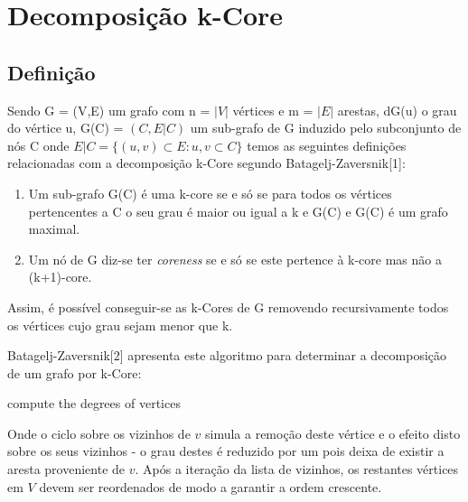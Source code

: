 \documentclass[a4paper,10pt]{report}
\begin{document}
\section*{Decomposição k-Core}


\subsection*{Definição}
Sendo G = (V,E) um grafo com n = $|V|$ vértices e m = $|E|$ arestas, dG(u) o grau do vértice u, G(C) = $(C, E|C)$ um sub-grafo de G induzido pelo subconjunto de nós C onde $E|C = \{(u,v)\subset E : u,v \subset C\} $ temos as seguintes definições relacionadas com a decomposição k-Core segundo Batagelj-Zaversnik[1]:

\begin{enumerate}
	\item Um sub-grafo G(C) é uma k-core se e só se para todos os vértices pertencentes a C o seu grau é maior ou igual a k e G(C) e G(C) é um grafo maximal.
	\item Um nó de G diz-se ter \textit{coreness} se e só se este pertence à k-core mas não a (k+1)-core.
\end{enumerate}


Assim, é possível conseguir-se as k-Cores de G removendo recursivamente todos os vértices cujo grau sejam menor que k.

Batagelj-Zaversnik[2] apresenta este algoritmo para determinar a decomposição de um grafo por k-Core:

\begin{algorithm}[H]
 compute the degrees of vertices\;
\end{algorithm}

Onde o ciclo sobre os vizinhos de $v$ simula a remoção deste vértice e o efeito disto sobre os seus vizinhos - o grau destes é reduzido por um pois deixa de existir a aresta proveniente de $v$.
Após a iteração da lista de vizinhos, os restantes vértices em $V$ devem ser reordenados de modo a garantir a ordem crescente.


\end{document}
